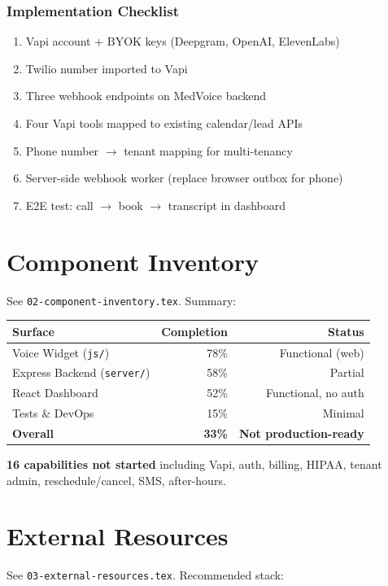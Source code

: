 \documentclass[11pt,a4paper]{report}
\begin{document}
\subsection{Implementation Checklist}
\begin{enumerate}
  \item Vapi account + BYOK keys (Deepgram, OpenAI, ElevenLabs)
  \item Twilio number imported to Vapi
  \item Three webhook endpoints on MedVoice backend
  \item Four Vapi tools mapped to existing calendar/lead APIs
  \item Phone number $\rightarrow$ tenant mapping for multi-tenancy
  \item Server-side webhook worker (replace browser outbox for phone)
  \item E2E test: call $\rightarrow$ book $\rightarrow$ transcript in dashboard
\end{enumerate}

\chapter{Component Inventory}
See \texttt{02-component-inventory.tex}. Summary:

\begin{center}
\small
\begin{tabular}{@{}lrr@{}}
\toprule
\textbf{Surface} & \textbf{Completion} & \textbf{Status} \\
\midrule
Voice Widget (\texttt{js/}) & 78\% & Functional (web) \\
Express Backend (\texttt{server/}) & 58\% & Partial \\
React Dashboard & 52\% & Functional, no auth \\
Tests \& DevOps & 15\% & Minimal \\
\midrule
\textbf{Overall} & \textbf{33\%} & \textbf{Not production-ready} \\
\bottomrule
\end{tabular}
\end{center}

\textbf{16 capabilities not started} including Vapi, auth, billing, HIPAA, tenant admin, reschedule/cancel, SMS, after-hours.

\chapter{External Resources}
See \texttt{03-external-resources.tex}. Recommended stack:
\end{document}
